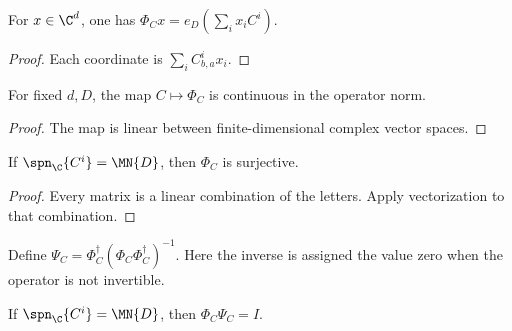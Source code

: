 \begin{lemma}
    \label{thm:spc_aux_coefficient_evaluation}
    \leanok
    For $x\in\C^d$, one has
    $\Phi_Cx=e_D(\sum_i x_i C^i)$.
\end{lemma}

\begin{proof}\leanok
    Each coordinate is $\sum_i C^i_{b,a}x_i$.
\end{proof}

\begin{lemma}
    \label{thm:spc_aux_coefficient_continuity}
    \leanok
    For fixed $d,D$, the map $C\mapsto\Phi_C$ is continuous in the
    operator norm.
\end{lemma}

\begin{proof}\leanok
    The map is linear between finite-dimensional complex vector spaces.
\end{proof}

\begin{lemma}
    \label{thm:spc_aux_coefficient_surjective}
    \leanok
    If $\spn_{\C}\{C^i\}=\MN{D}$, then $\Phi_C$ is surjective.
\end{lemma}

\begin{proof}\leanok
    Every matrix is a linear combination of the letters. Apply vectorization
    to that combination.
\end{proof}

\begin{definition}
    \label{def:spc_aux_coefficient_inverse}
    \leanok
    Define $\Psi_C=\Phi_C^\dagger(\Phi_C\Phi_C^\dagger)^{-1}$.
    Here the inverse is assigned the value zero when the operator is not
    invertible.
\end{definition}

\begin{lemma}
    \label{thm:spc_aux_coefficient_inverse_identity}
    \leanok
    If $\spn_{\C}\{C^i\}=\MN{D}$, then $\Phi_C\Psi_C=I$.
\end{lemma}

